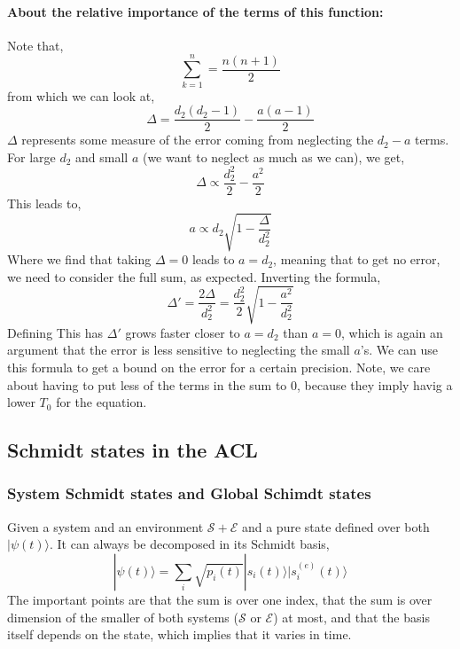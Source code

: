 \documentclass{article}
\begin{document}
\paragraph{About the relative importance of the terms of this function: }Note that,
\begin{equation}
    \sum^n_{k=1}=\frac{n(n+1)}{2}
\end{equation}
from which we can look at,
\begin{equation}
    \Delta=\frac{d_2(d_2-1)}{2}-\frac{a(a-1)}{2}
\end{equation}
$\Delta$ represents some measure of the error coming from neglecting the $d_2-a$ terms. 
For large $d_2$ and small $a$ (we want to neglect as much as we can), we get,
\begin{equation}
    \Delta\propto \frac{d^2_2}{2}-\frac{a^2}{2}
\end{equation}
This leads to,
\begin{equation}
    a\propto d_2\sqrt{1-\frac{\Delta}{d_2^2}}
\end{equation}
Where we find that taking $\Delta=0$ leads to $a=d_2$, meaning that to get no error, we need to consider the full sum, as expected.
Inverting the formula,
\begin{equation}
    \Delta'=\frac{2\Delta}{d_2^2}=\frac{d_2^2}{2}\sqrt{1-\frac{a^2}{d_2^2}} 
\end{equation}
Defining 
This has $\Delta'$ grows faster closer to $a=d_2$ than $a=0$, which is again an argument that the error is less sensitive to neglecting the small $a$'s.
We can use this formula to get a bound on the error for a certain precision. 
Note, we care about having to put less of the terms in the sum to 0, because they imply havig a lower $T_0$ for the equation. 

\subsection{Schmidt states in the ACL}

\subsubsection{System Schmidt states and Global Schimdt states}

Given a system and an environment $\mathcal{S} + \mathcal{E}$ and a pure state defined over both $|\psi(t)\rangle$. It can always be decomposed in its Schmidt basis,
\begin{equation}
    |\psi(t)\rangle = \sum_i \sqrt{p_i(t)}|s_i(t)\rangle|s^{(e)}_i(t)\rangle
\end{equation}
The important points are that the sum is over one index, that the sum is over dimension of the smaller of both systems ($\mathcal{S}$ or $\mathcal{E}$) at most, and that the basis itself depends on the state, which implies that it varies in time.
\end{document}
